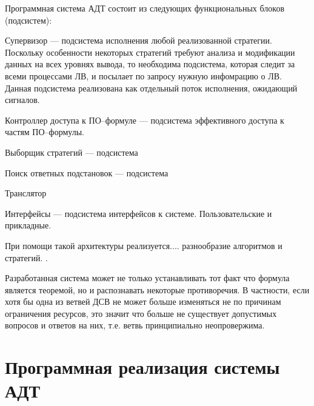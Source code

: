 Программная система АДТ состоит из следующих функциональных блоков (подсистем):
\begin{description}
  \item{Супервизор} --- подсистема исполнения любой реализованной стратегии. Поскольку особенности некоторых стратегий требуют анализа и модификации данных на всех уровнях вывода, то необходима подсистема, которая следит за всеми процессами ЛВ, и посылает по запросу нужную инфомрацию о ЛВ. Данная подсистема реализована как отдельный поток исполнения, ожидающий сигналов.
  \item{Контроллер доступа к ПО--формуле} --- подсистема эффективного доступа к частям ПО--формулы.
  \item{Выборщик стратегий} --- подсистема
  \item{Поиск ответных подстановок} --- подсистема
  \item{Транслятор}
  \item{Интерфейсы} --- подсистема интерфейсов к системе. Пользовательские и прикладные.

\end{description}

При помощи такой архитектуры реализуется.... разнообразие алгоритмов и стратегий. .

Разработанная система может не только устанавливать тот факт что формула является теоремой, но и распознавать некоторые противоречия. В частности, если хотя бы одна из ветвей ДСВ не может больше изменяться не по причинам ограничения ресурсов, это значит что больше не существует допустимых вопросов и ответов на них, т.е. ветвь принципиально неопровержима.


\section{Программная реализация системы АДТ}

